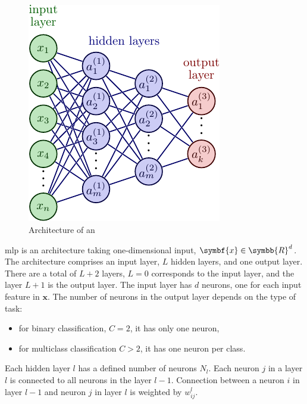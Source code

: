 \documentclass[../main.tex]{subfiles}
\begin{document}
	\subsection{}\label{subsec:mlp}
		\begin{figure}
			\vspace{-1\intextsep}
			\centering
			\includegraphics{mlp.pdf}
			\caption{Architecture of an }\label{fig:mlp}
		\end{figure}
		\Gls{mlp} is an architecture taking one-dimensional input, \(\symbf{x} \in \symbb{R}^d\).
		The architecture comprises an input layer, \(L\) hidden layers, and one output layer.
		There are a total of \(L+2\) layers, \(L=0\) corresponds to the input layer, and the layer \(L+1\) is the output layer.
		The input layer has \(d\) neurons, one for each input feature in \(\symbf{x}\).
		The number of neurons in the output layer depends on the type of task:
		\begin{itemize}
			\item for binary classification, \(C=2\), it has only one neuron,
			\item for multiclass classification \(C > 2 \), it has one neuron per class.
		\end{itemize}
		Each hidden layer \(l\) has a defined number of neurons \(N_{l}\).
		Each neuron \(j\) in a layer \(l\) is connected to all neurons in the layer \(l-1\).
		Connection between a neuron \(i\) in layer \(l-1\) and neuron \(j\) in layer \(l\) is weighted by \(w^{l}_{ij}\).
\end{document}
